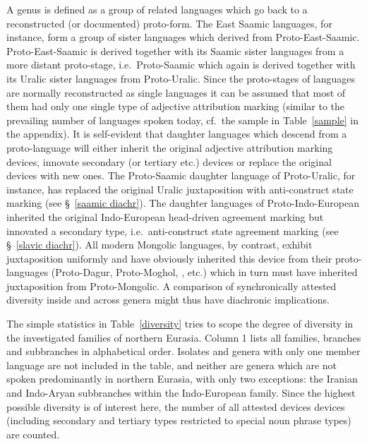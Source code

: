 A genus is defined as a group of related languages which go back to a reconstructed (or documented) proto-form. The East Saamic languages, for instance, form a group of sister languages which derived from Proto-East-Saamic. Proto-East-Saamic is derived together with its Saamic sister languages from a more distant proto-stage, i.e.~Proto-Saamic which again is derived together with its Uralic sister languages from Proto-Uralic. Since the proto-stages of languages are normally reconstructed as single languages it can be assumed that most of them had only one single type of adjective attribution marking (similar to the prevailing number of languages spoken today, cf.~the sample in Table~\ref{sample} in the appendix). It is self-evident that daughter languages which descend from a proto-language will either inherit the original adjective attribution marking devices, innovate secondary (or tertiary etc.) devices or replace the original devices with new ones. The Proto-Saamic daughter language of Proto-Uralic, for instance, has replaced the original Uralic juxtaposition with anti-construct state marking (see \S~\ref{saamic diachr}). The  daughter languages of Proto-Indo-European inherited the original Indo-European head-driven agreement marking but innovated a secondary type, i.e.~anti-construct state agreement marking (see \S~\ref{slavic diachr}). All modern Mongolic languages, by contrast, exhibit juxtaposition uniformly and have obviously inherited this device from their proto-languages (Proto-Dagur, Proto-Moghol, , etc.) which in turn must have inherited juxtaposition from Proto-Mongolic. A comparison of synchronically attested diversity inside and across genera might thus have diachronic implications.

The simple statistics in Table~\ref{diversity} tries to scope the degree of diversity in the investigated families of northern Eurasia. Column 1 lists all families, branches and subbranches in alphabetical order. Isolates and genera with only one member language are not included in the table, and neither are genera which are not spoken predominantly in northern Eurasia, with only two exceptions: the Iranian and Indo-Aryan subbranches within the Indo-European family. Since the highest possible diversity is of interest here, the number of all attested devices devices (including secondary and tertiary types restricted to special noun phrase types) are counted. 

